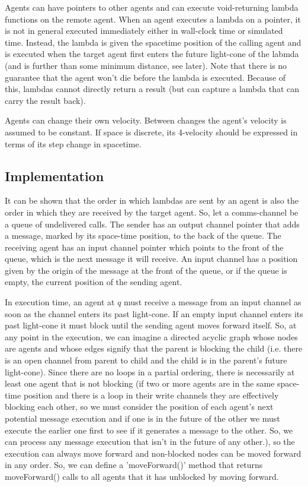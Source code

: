 \documentclass[a4paper]{article}
\begin{document}
Agents can have pointers to other agents and can execute void-returning lambda functions on the remote agent. When an agent executes a lambda on a pointer, it is not in general executed immediately either in wall-clock time or simulated time. Instead, the lambda is given the spacetime position of the calling agent and is executed when the target agent first enters the future light-cone of the labmda (and is further than some minimum distance, see later). Note that there is no guarantee that the agent won't die before the lambda is executed. Because of this, lambdas cannot directly return a result (but can capture a lambda that can carry the result back).

Agents can change their own velocity. Between changes the agent's velocity is assumed to be constant. If space is discrete, its 4-velocity should be expressed in terms of its step change in spacetime.

\subsection{Implementation}



It can be shown that the order in which lambdas are sent by an agent is also the order in which they are received by the target agent. So, let a comms-channel be a queue of undelivered calls. The sender has an output channel pointer that adds a message, marked by its space-time position, to the back of the queue. The receiving agent has an input channel pointer which points to the front of the queue, which is the next message it will receive. An input channel has a position given by the origin of the message at the front of the queue, or if the queue is empty, the current position of the sending agent.

In execution time, an agent at $q$ must receive a message from an input channel as soon as the channel enters its past light-cone. If an empty input channel enters its past light-cone it must block until the sending agent moves forward itself. So, at any point in the execution, we can imagine a directed acyclic graph whose nodes are agents and whose edges signify that the parent is blocking the child (i.e. there is an open channel from parent to child and the child is in the parent's future light-cone). Since there are no loops in a partial ordering, there is necessarily at least one agent that is not blocking (if two or more agents are in the same space-time position and there is a loop in their write channels they are effectively blocking each other, so we must consider the position of each agent's next potential message execution and if one is in the future of the other we must execute the earlier one first to see if it generates a message to the other. So, we can process any message execution that isn't in the future of any other.), so the execution can always move forward and non-blocked nodes can be moved forward in any order. So, we can define a 'moveForward()' method that returns moveForward() calls to all agents that it has unblocked by moving forward.
\end{document}
